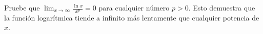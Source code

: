 \item Pruebe que $\displaystyle \lim_{x \to \infty} \frac{\ln x}{x^p} = 0$ para cualquier número $p > 0$. Esto demuestra que la función logarítmica tiende a infinito más lentamente que cualquier potencia de $x$.
